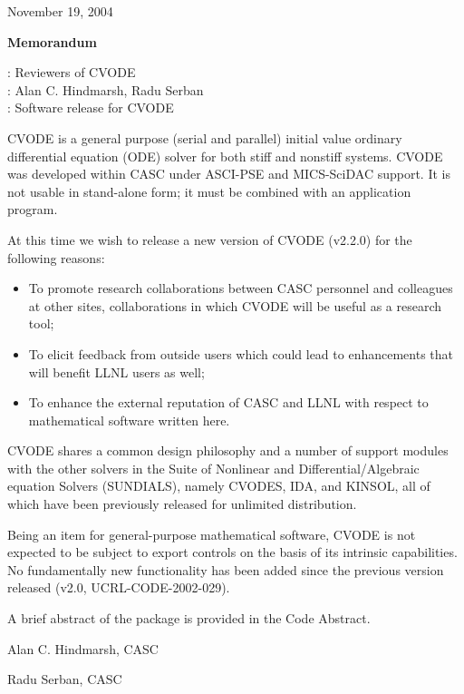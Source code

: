 \documentclass[12pt]{letter}
\begin{document}
\pagestyle{empty}

\begin{letter}

\hfill November 19, 2004

\vspace{0.2in}
\centerline{\bf Memorandum}

: Reviewers of CVODE \\
: Alan C. Hindmarsh, Radu Serban \\
: Software release for CVODE

CVODE is a general purpose (serial and parallel) initial value ordinary differential 
equation (ODE) solver for both stiff and nonstiff systems.
CVODE was developed within CASC under ASCI-PSE and MICS-SciDAC support. 
It is not usable in stand-alone form; it must be combined with an application program.

At this time we wish to release a new version of CVODE (v2.2.0) for the 
following reasons:
\begin{itemize}
\item To promote research collaborations between CASC personnel and colleagues at 
      other sites, collaborations in which CVODE will be useful as a research tool;
\item To elicit feedback from outside users which could lead to enhancements that will 
      benefit LLNL users as well;
\item To enhance the external reputation of CASC and LLNL with respect to 
      mathematical software written here.
\end{itemize}

CVODE shares a common design philosophy and a number of support modules with the 
other solvers in the Suite of Nonlinear and Differential/Algebraic equation Solvers (SUNDIALS), 
namely CVODES, IDA, and KINSOL, all of which have been previously released for unlimited 
distribution.

Being an item for general-purpose mathematical software, CVODE is not expected to be 
subject to export controls on the basis of its intrinsic capabilities. 
No fundamentally new functionality has been added since the previous version released
(v2.0, UCRL-CODE-2002-029).

A brief abstract of the package is provided in the Code Abstract. 


\vspace{0.5in}                 
\hfill Alan C. Hindmarsh, CASC

\vspace{0.5in}                 
\hfill Radu Serban, CASC

\end{letter}
\end{document}

